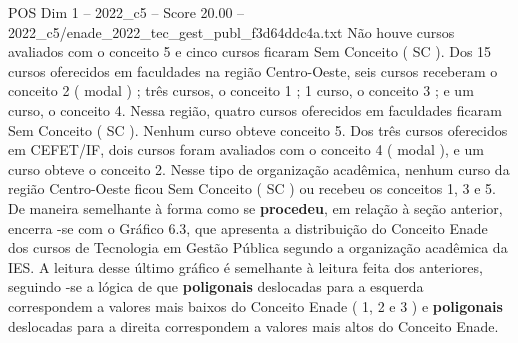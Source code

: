 \begin{textsample}{POS Dim 1 – 2022\_c5 – Score 20.00 – 2022\_c5/enade\_2022\_tec\_gest\_publ\_f3d64ddc4a.txt}
Não houve cursos avaliados com o conceito 5 e cinco cursos ficaram Sem Conceito ( SC ).
Dos 15 cursos oferecidos em faculdades na região Centro-Oeste, seis cursos receberam o conceito 2 ( modal ) ; três cursos, o conceito 1 ; 1 curso, o conceito 3 ; e um curso, o conceito 4.
Nessa região, quatro cursos oferecidos em faculdades ficaram Sem Conceito ( SC ).
Nenhum curso obteve conceito 5.
Dos três cursos oferecidos em CEFET/IF, dois cursos foram avaliados com o conceito 4 ( modal ), e um curso obteve o conceito 2.
Nesse tipo de organização acadêmica, nenhum curso da região Centro-Oeste ficou Sem Conceito ( SC ) ou recebeu os conceitos 1, 3 e 5.
De maneira semelhante à forma como se \textbf{procedeu}, em relação à seção anterior, encerra -se com o Gráfico 6.3, que apresenta a distribuição do Conceito Enade dos cursos de Tecnologia em Gestão Pública segundo a organização acadêmica da IES.
A leitura desse último gráfico é semelhante à leitura feita dos anteriores, seguindo -se a lógica de que \textbf{poligonais} deslocadas para a esquerda correspondem a valores mais baixos do Conceito Enade ( 1, 2 e 3 ) e \textbf{poligonais} deslocadas para a direita correspondem a valores mais altos do Conceito Enade.

\end{textsample}
